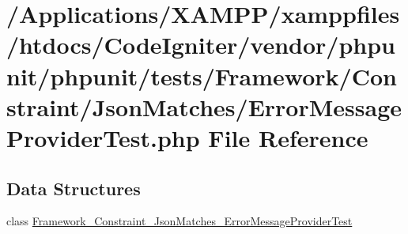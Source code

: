\hypertarget{_error_message_provider_test_8php}{}\section{/\+Applications/\+X\+A\+M\+P\+P/xamppfiles/htdocs/\+Code\+Igniter/vendor/phpunit/phpunit/tests/\+Framework/\+Constraint/\+Json\+Matches/\+Error\+Message\+Provider\+Test.php File Reference}
\label{_error_message_provider_test_8php}
\subsection*{Data Structures}
\begin{DoxyCompactItemize}
\item 
class \mbox{\hyperlink{class_framework___constraint___json_matches___error_message_provider_test}{Framework\+\_\+\+Constraint\+\_\+\+Json\+Matches\+\_\+\+Error\+Message\+Provider\+Test}}
\end{DoxyCompactItemize}
